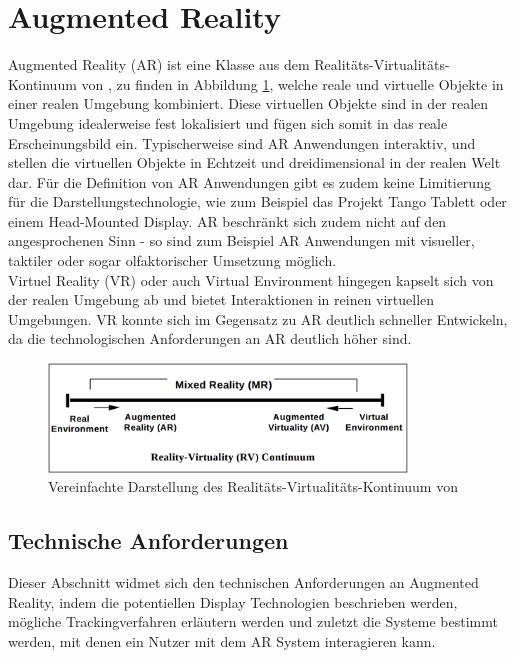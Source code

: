 
\section{Augmented Reality}

Augmented Reality (AR) ist eine Klasse aus dem Realitäts-Virtualitäts-Kontinuum von \cite{milgram1995augmented}, zu finden in Abbildung \ref{fig:virtual-continuum}, welche reale und virtuelle Objekte in einer realen Umgebung kombiniert. Diese virtuellen Objekte sind in der realen Umgebung idealerweise fest lokalisiert und fügen sich somit in das reale Erscheinungsbild ein. Typischerweise sind AR Anwendungen interaktiv, und stellen die virtuellen Objekte in Echtzeit und dreidimensional in der realen Welt dar. Für die Definition von AR Anwendungen gibt es zudem keine Limitierung für die Darstellungstechnologie, wie zum Beispiel das Projekt Tango Tablett oder einem Head-Mounted Display. AR beschränkt sich zudem nicht auf den angesprochenen Sinn - so sind zum Beispiel AR Anwendungen mit visueller, taktiler oder sogar olfaktorischer Umsetzung möglich.\\

Virtuel Reality (VR) oder auch Virtual Environment hingegen kapselt sich von der realen Umgebung ab und bietet Interaktionen in reinen virtuellen Umgebungen. VR konnte sich im Gegensatz zu AR deutlich schneller Entwickeln, da die technologischen Anforderungen an AR deutlich höher sind. \citep{van2010survey}\\

\begin{figure}
  \centering
	\includegraphics[width=0.85\textwidth]{content/images/theory/virtual-continuum.png} 
  \caption{Vereinfachte Darstellung des Realitäts-Virtualitäts-Kontinuum von \citet*{milgram1995augmented}}
  \label{fig:virtual-continuum}
\end{figure}

\subsection{Technische Anforderungen}

Dieser Abschnitt widmet sich den technischen Anforderungen an Augmented Reality, indem die potentiellen Display Technologien beschrieben werden, mögliche Trackingverfahren erläutern werden und zuletzt die Systeme bestimmt werden, mit denen ein Nutzer mit dem AR System interagieren kann.\\

